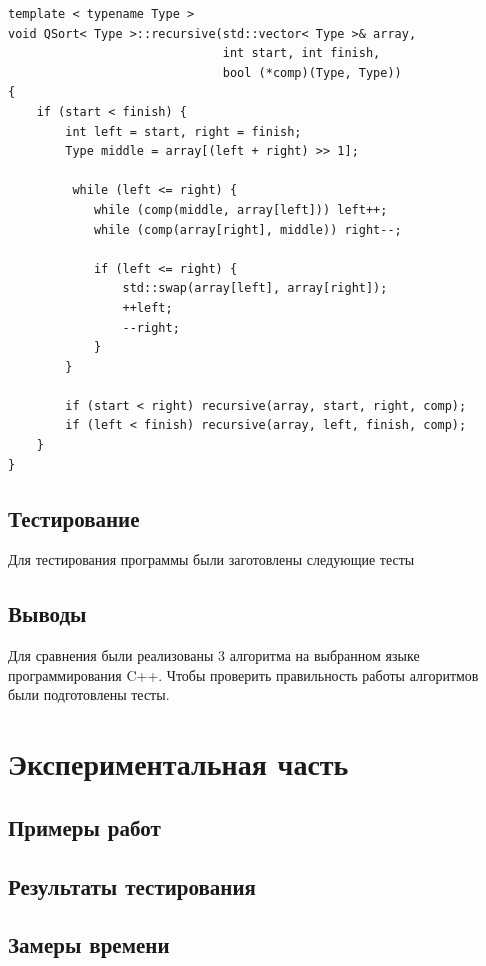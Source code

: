 \documentclass[a4paper,12pt]{article}
\begin{document}
\begin{lstlisting}[caption=Быстрая сортировка]
template < typename Type >
void QSort< Type >::recursive(std::vector< Type >& array,
                              int start, int finish,
                              bool (*comp)(Type, Type))
{
    if (start < finish) {
        int left = start, right = finish;
        Type middle = array[(left + right) >> 1];

         while (left <= right) {
            while (comp(middle, array[left])) left++;
            while (comp(array[right], middle)) right--;

            if (left <= right) {
                std::swap(array[left], array[right]);
                ++left;
                --right;
            }
        }

        if (start < right) recursive(array, start, right, comp);
        if (left < finish) recursive(array, left, finish, comp);
    }
}
\end{lstlisting}

\subsection{Тестирование}

Для тестирования программы были заготовлены следующие тесты

\subsection{Выводы}

Для сравнения были реализованы 3 алгоритма на выбранном языке
программирования C++. Чтобы проверить правильность работы алгоритмов
были подготовлены тесты.

\newpage
\section{Экспериментальная часть}

\subsection{Примеры работ}

\subsection{Результаты тестирования}

\subsection{Замеры времени}
\end{document}
